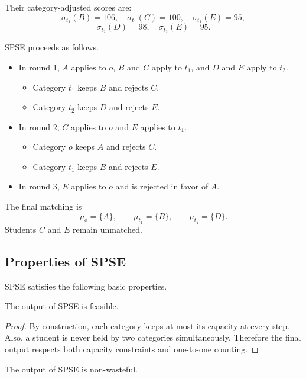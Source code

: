 \documentclass[runningheads]{llncs}
\newcommand{\1}{\mathbf{1}}
\begin{document}
Their category-adjusted scores are:
\[
\sigma_{t_1}(B)=106,\quad \sigma_{t_1}(C)=100,\quad \sigma_{t_1}(E)=95,
\]
\[
\sigma_{t_2}(D)=98,\quad \sigma_{t_2}(E)=95.
\]

SPSE proceeds as follows.

\begin{itemize}
\item In round 1, $A$ applies to $o$, $B$ and $C$ apply to $t_1$, and $D$ and $E$ apply to $t_2$.
\begin{itemize}
    \item Category $t_1$ keeps $B$ and rejects $C$.
    \item Category $t_2$ keeps $D$ and rejects $E$.
\end{itemize}
\item In round 2, $C$ applies to $o$ and $E$ applies to $t_1$.
\begin{itemize}
    \item Category $o$ keeps $A$ and rejects $C$.
    \item Category $t_1$ keeps $B$ and rejects $E$.
\end{itemize}
\item In round 3, $E$ applies to $o$ and is rejected in favor of $A$.
\end{itemize}

The final matching is
\[
\mu_o=\{A\},\qquad \mu_{t_1}=\{B\},\qquad \mu_{t_2}=\{D\}.
\]
Students $C$ and $E$ remain unmatched.

\subsection{Properties of SPSE}

SPSE satisfies the following basic properties.

\begin{proposition}[Feasibility]
The output of SPSE is feasible.
\end{proposition}

\begin{proof}
By construction, each category keeps at most its capacity at every step. Also, a student is never held by two categories simultaneously. Therefore the final output respects both capacity constraints and one-to-one counting.
\end{proof}

\begin{proposition}
The output of SPSE is non-wasteful.
\end{proposition}
\end{document}
